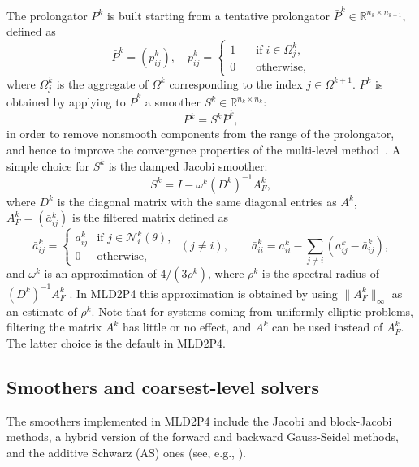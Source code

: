 The prolongator $P^k$ is built starting from a tentative prolongator
$\bar{P}^k \in \mathbb{R}^{n_k \times n_{k+1}}$, defined as
$$
\bar{P}^k =(\bar{p}_{ij}^k), \quad  \bar{p}_{ij}^k = 
\left\{ \begin{array}{ll}
1 & \quad \mbox{if} \; i \in \Omega^k_j, \\
0 & \quad \mbox{otherwise},
\end{array} \right.
\label{eq:tent_prol}
$$
where $\Omega^k_j$ is the aggregate of $\Omega^k$
corresponding to the index $j \in \Omega^{k+1}$.
$P^k$ is obtained by applying to $\bar{P}^k$ a smoother
$S^k \in \mathbb{R}^{n_k \times n_k}$:
$$
P^k = S^k \bar{P}^k,
$$
in order to remove nonsmooth components from the range of the prolongator,
and hence to improve the convergence properties of the multi-level
method~\cite{BREZINA_VANEK,Stuben_01}.
A simple choice for $S^k$ is the damped Jacobi smoother:
$$
S^k = I - \omega^k (D^k)^{-1} A^k_F , 
$$
where $D^k$ is the diagonal matrix with the same diagonal entries as $A^k$,
$A^k_F = (\bar{a}_{ij}^k)$ is the filtered matrix defined as
\begin{equation}
\label{eq:filtered}
  \bar{a}_{ij}^k =
   \left \{ \begin{array}{ll}
   a_{ij}^k & \mbox{if } j \in \mathcal{N}_i^k(\theta), \\
   0            & \mbox{otherwise},
   \end{array} \right.
   \; (j \ne i),
   \qquad
   \bar{a}_{ii}^k = a_{ii}^k - \sum_{j \ne i} (a_{ij}^k - \bar{a}_{ij}^k),
\end{equation}
and $\omega^k$ is an approximation of $4/(3\rho^k)$, where
$\rho^k$ is the spectral radius of $(D^k)^{-1}A^k_F$ \cite{BREZINA_VANEK}.
In MLD2P4 this approximation is obtained by using $\| A^k_F \|_\infty$ as an estimate
of $\rho^k$. Note that for systems coming from uniformly elliptic
problems, filtering the matrix $A^k$ has little or no effect, and
$A^k$ can be used instead of $A^k_F$. The latter choice is the default in MLD2P4.

\subsection{Smoothers and coarsest-level solvers\label{sec:smoothers}}

The smoothers implemented in MLD2P4 include the Jacobi and block-Jacobi methods,
a hybrid version of the forward and backward Gauss-Seidel methods, and the
additive Schwarz (AS) ones (see, e.g., \cite{Saad_book,dd2_96}). 

